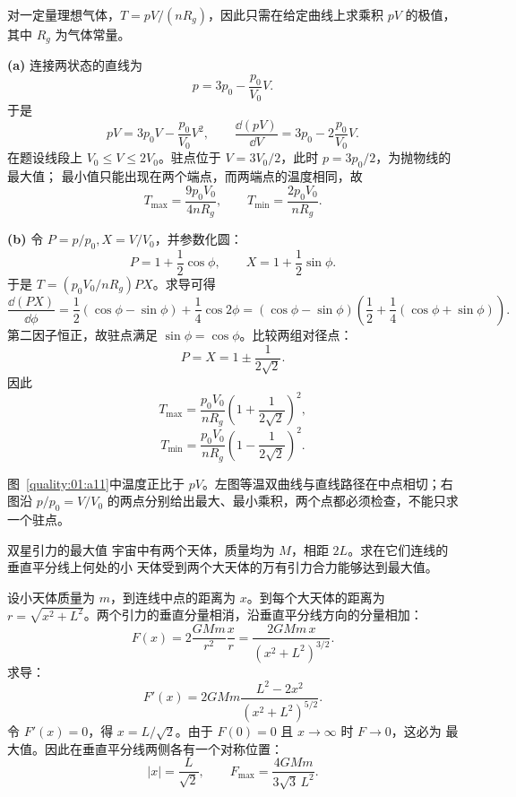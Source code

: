 {\begin{xesolution}
对一定量理想气体，$T=pV/(nR_g)$，因此只需在给定曲线上求乘积 $pV$ 的极值，其中
$R_g$ 为气体常量。

\textbf{(a)} 连接两状态的直线为
\[
 p=3p_0-\frac{p_0}{V_0}V.
\]
于是
\[
 pV=3p_0V-\frac{p_0}{V_0}V^2,\qquad
 \frac{\dd(pV)}{\dd V}=3p_0-2\frac{p_0}{V_0}V.
\]
在题设线段上 $V_0\le V\le2V_0$。驻点位于 $V=3V_0/2$，此时 $p=3p_0/2$，为抛物线的最大值；
最小值只能出现在两个端点，而两端点的温度相同，故
\[
 \boxed{T_{\max}=\frac{9p_0V_0}{4nR_g}},\qquad
 \boxed{T_{\min}=\frac{2p_0V_0}{nR_g}}.
\]

\textbf{(b)} 令 $P=p/p_0, X=V/V_0$，并参数化圆：
\[
 P=1+\frac12\cos\phi,\qquad X=1+\frac12\sin\phi.
\]
于是 $T=(p_0V_0/nR_g)PX$。求导可得
\[
 \frac{\dd(PX)}{\dd\phi}
 =\frac12(\cos\phi-\sin\phi)+\frac14\cos2\phi
 =(\cos\phi-\sin\phi)
 \left(\frac12+\frac14(\cos\phi+\sin\phi)\right).
\]
第二因子恒正，故驻点满足 $\sin\phi=\cos\phi$。比较两组对径点：
\[
 P=X=1\pm\frac{1}{2\sqrt2}.
\]
因此
\[
 \boxed{T_{\max}=\frac{p_0V_0}{nR_g}
  \left(1+\frac1{2\sqrt2}\right)^2},
\]
\[
 \boxed{T_{\min}=\frac{p_0V_0}{nR_g}
  \left(1-\frac1{2\sqrt2}\right)^2}.
\]


图~\ref{quality:01:a11}中温度正比于 $pV$。左图等温双曲线与直线路径在中点相切；右图沿 $p/p_0=V/V_0$ 的两点分别给出最大、最小乘积，两个点都必须检查，不能只求一个驻点。
\end{xesolution}

\begin{origexamplebox}{双星引力的最大值}\label{ch01:ex:s14-1-8}
宇宙中有两个天体，质量均为 $M$，相距 $2L$。求在它们连线的垂直平分线上何处的小
天体受到两个大天体的万有引力合力能够达到最大值。
\end{origexamplebox}

\begin{xesolution}
设小天体质量为 $m$，到连线中点的距离为 $x$。到每个大天体的距离为
$r=\sqrt{x^2+L^2}$。两个引力的垂直分量相消，沿垂直平分线方向的分量相加：
\[
 F(x)=2\frac{GMm}{r^2}\frac{x}{r}
 =\frac{2GMm\,x}{(x^2+L^2)^{3/2}}.
\]
求导：
\[
 F'(x)=2GMm\frac{L^2-2x^2}{(x^2+L^2)^{5/2}}.
\]
令 $F'(x)=0$，得 $x=L/\sqrt2$。由于 $F(0)=0$ 且 $x\to\infty$ 时 $F\to0$，这必为
最大值。因此在垂直平分线两侧各有一个对称位置：
\[
 \boxed{|x|=\frac{L}{\sqrt2}},
 \qquad
 \boxed{F_{\max}=\frac{4GMm}{3\sqrt3\,L^2}}.
\]


\end{xesolution}}
